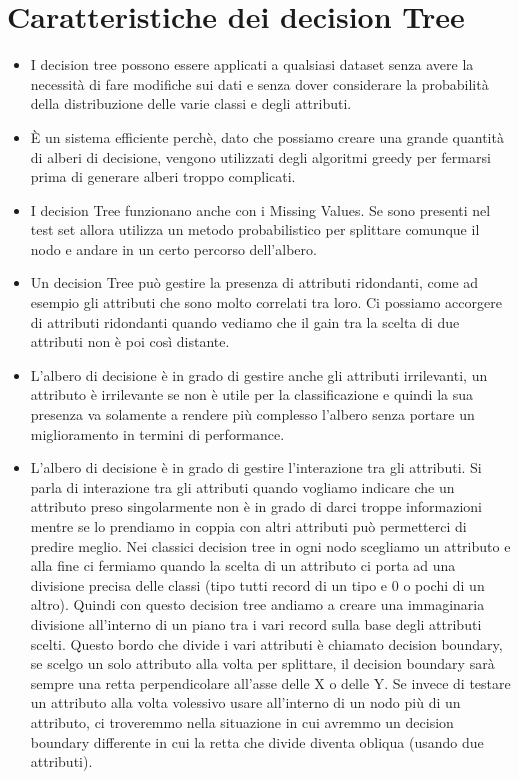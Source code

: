 \documentclass[14pt]{extreport}
\begin{document}
\section{Caratteristiche dei decision Tree}

\begin{itemize}
    \item I decision tree possono essere applicati a qualsiasi dataset senza avere la necessità di fare modifiche sui dati e senza dover considerare la probabilità della distribuzione delle varie classi e degli attributi.
    \item È un sistema efficiente perchè, dato che possiamo creare una grande quantità di alberi di decisione, vengono utilizzati degli algoritmi greedy per fermarsi prima di generare alberi troppo complicati.
    \item I decision Tree funzionano anche con i Missing Values.  Se sono presenti nel test set allora utilizza un metodo probabilistico per splittare comunque il nodo e andare in un certo percorso dell'albero.
    \item Un decision Tree può gestire la presenza di attributi ridondanti, come ad esempio gli attributi che sono molto correlati tra loro. Ci possiamo accorgere di attributi ridondanti quando vediamo che il gain tra la scelta di due attributi non è poi così distante.
    \item L'albero di decisione è in grado di gestire anche gli attributi irrilevanti, un attributo è irrilevante se non è utile per la classificazione e quindi la sua presenza va solamente a rendere più complesso l'albero senza portare un miglioramento in termini di performance.
    \item L'albero di decisione è in grado di gestire l'interazione tra gli attributi. Si parla di interazione tra gli attributi quando vogliamo indicare che un attributo preso singolarmente non è in grado di darci troppe informazioni mentre se lo prendiamo in coppia con altri attributi può permetterci di predire meglio.
    Nei classici decision tree in ogni nodo scegliamo un attributo e alla fine ci fermiamo quando la scelta di un attributo ci porta ad una divisione precisa delle classi (tipo tutti record di un tipo e 0 o pochi di un altro).
    Quindi con questo decision tree andiamo a creare una immaginaria divisione all'interno di un piano tra i vari record sulla base degli attributi scelti.
    Questo bordo che divide i vari attributi è chiamato decision boundary, se scelgo un solo attributo alla volta per splittare, il decision boundary sarà sempre una retta perpendicolare all'asse delle X o delle Y.
    Se invece di testare un attributo alla volta volessivo usare all'interno di un nodo più di un attributo, ci troveremmo nella situazione in cui avremmo un decision boundary differente in cui la retta che divide diventa obliqua (usando due attributi).
\end{itemize}
\end{document}
